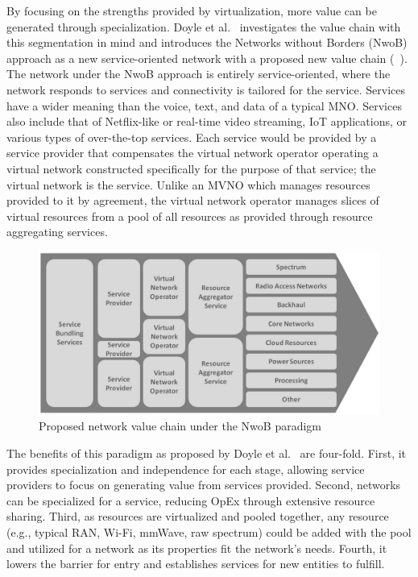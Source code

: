 \documentclass[12pt,dvipsnames]{report}
\begin{document}
By focusing on the strengths provided by virtualization, more value can be generated through specialization.  Doyle et al.~\cite{6737248} investigates the value chain with this segmentation in mind and introduces the Networks without Borders (NwoB) approach as a new service-oriented network with a proposed new value chain (~\cite{6737248}).  The network under the NwoB approach is entirely service-oriented, where the network responds to services and connectivity is tailored for the service.  Services have a wider meaning than the voice, text, and data of a typical MNO.  Services also include that of Netflix-like or real-time video streaming, IoT applications, or various types of over-the-top services.  Each service would be provided by a service provider that compensates the virtual network operator operating a virtual network constructed specifically for the purpose of that service; the virtual network is the service.  Unlike an MVNO which manages resources provided to it by agreement, the virtual network operator manages slices of virtual resources from a pool of all resources as provided through resource aggregating services.

\begin{figure}[ht]
	\centering
	\includegraphics[width=1\linewidth]{NwoBValueChain}
	\caption[Proposed network value chain under the NwoB paradigm]{Proposed network value chain under the NwoB paradigm~\cite{6737248}}
	\label{fig:NwoBValueChain}
\end{figure}

The benefits of this paradigm as proposed by Doyle et al.~\cite{6737248} are four-fold.  First, it provides specialization and independence for each stage, allowing service providers to focus on generating value from services provided.  Second, networks can be specialized for a service, reducing OpEx through extensive resource sharing.  Third, as resources are virtualized and pooled together, any resource (e.g., typical RAN, Wi-Fi, mmWave, raw spectrum) could be added with the pool and utilized for a network as its properties fit the network's needs.  Fourth, it lowers the barrier for entry and establishes services for new entities to fulfill.
\end{document}
